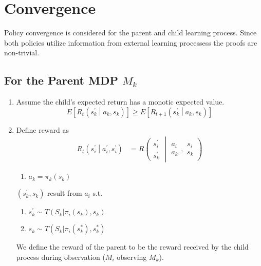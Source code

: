 \section{Convergence}
\label{sec:convergence} 

Policy convergence is considered for the parent and child learning process. Since both policies utilize information from external learning processess the proofs are non-trivial. 


\subsection{For the Parent MDP $M_k$}

\begin{enumerate}[label=\arabic*.]
\item Assume the child's expected return has a monotic expected value.
\begin{equation*}
E\left[ R_t \left( s^\prime_k \middle| a_k, s_k \right) \right] \ge E\left[ R_{t+1}\left( s^\prime_k \middle| a_k, s_k  \right) \right]
\end{equation*}
\item{Define reward as}
\begin{align*}
R_t\left( s^\prime_i \middle| a^\prime_i, s^\prime_i \right) & = R\left( \begin{array}{c} s^\prime_i \\ s^\prime_k \end{array} \middle| 
\begin{array}{c}a_i \\ a_k \end{array}, \begin{array}{c} s_i \\ s_k \end{array} \right)
\end{align*}
\hspace*{6cm}
\begin{minipage}[t]{\linegoal}
\begin{enumerate}[label=$\qquad$\roman*.]
\item $a_k = \pi_k( s_k )$
\end{enumerate}
$( s^\prime_k, s_k )$ result from $a_i$ s.t.
\begin{enumerate}[label=$\qquad$\roman*.,start=2]
\item $s^\prime_k \sim T( S_k | \pi_i( s_k ), s_k )$
\item $s_k \sim T( S_k | \pi_i( s^\ast_k ), s^\ast_k )$
\end{enumerate}
\end{minipage}
We define the reward of the parent to be the reward received by the child process during observation ($M_i$ observing $M_k$).
\end{enumerate}

